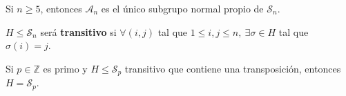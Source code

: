     \begin{coro}
        Si $n \ge 5$, entonces $\mathcal{A}_n$ es el único subgrupo normal propio de $\mathcal{S}_n$.
    \end{coro}

    \begin{defi}
        $H \le \mathcal{S}_n$ será \textbf{transitivo} si $\forall \left( i, j \right)$ tal que $1 \le i, j \le n,\ \exists \sigma \in H$ tal que $\sigma \left( i \right) = j$.
    \end{defi}

    \begin{prop}
        Si $p \in \mathbb{Z}$ es primo y $H \le \mathcal{S}_p$ transitivo que contiene una transposición, entonces $H = \mathcal{S}_p$.
    \end{prop}
